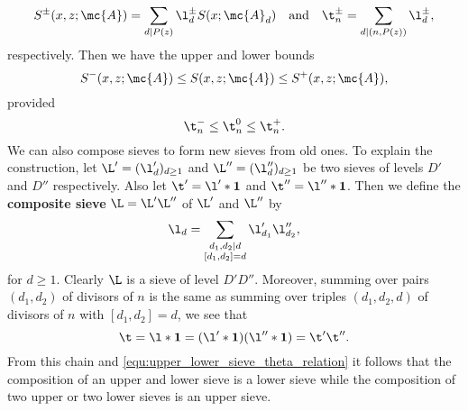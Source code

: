     \[
      S^{\pm}(x,z;\mc{A}) = \sum_{d \mid P(z)}\l_{d}^{\pm}S(x;\mc{A}_{d}) \quad \text{and} \quad \t_{n}^{\pm} = \sum_{d \mid (n,P(z))}\l_{d}^{\pm},
    \]
    respectively. Then we have the upper and lower bounds
    \[
      S^{-}(x,z;\mc{A}) \le S(x,z;\mc{A}) \le S^{+}(x,z;\mc{A}),
    \]
    provided
    \begin{equation}\label{equ:upper_lower_sieve_theta_relation}
      \t_{n}^{-} \le \t_{n}^{0} \le \t_{n}^{+}.
    \end{equation}
    We can also compose sieves to form new sieves from old ones. To explain the construction, let $\L' = (\l'_{d})_{d \ge 1}$ and $\L'' = (\l''_{d})_{d \ge 1}$ be two sieves of levels $D'$ and $D''$ respectively. Also let $\t' = \l' \ast \mathbf{1}$ and $\t'' = \l'' \ast \mathbf{1}$. Then we define the \textbf{composite sieve} $\L = \L'\L''$ of $\L'$ and $\L''$ by
    \[
      \l_{d} = \sum_{\substack{ d_{1},d_{2} \mid d \\ [d_{1},d_{2}] = d}}\l'_{d_{1}}\l''_{d_{2}},
    \]
    for $d \ge 1$. Clearly $\L$ is a sieve of level $D'D''$. Moreover, summing over pairs $(d_{1},d_{2})$ of divisors of $n$ is the same as summing over triples $(d_{1},d_{2},d)$ of divisors of $n$ with $[d_{1},d_{2}] = d$, we see that
    \[
      \t = \l \ast \mathbf{1} = (\l' \ast \mathbf{1})(\l'' \ast \mathbf{1}) = \t'\t''.
    \]
    From this chain and \cref{equ:upper_lower_sieve_theta_relation} it follows that the composition of an upper and lower sieve is a lower sieve while the composition of two upper or two lower sieves is an upper sieve.
